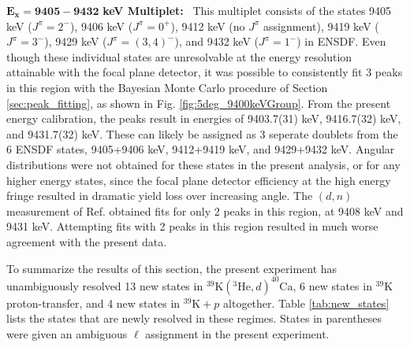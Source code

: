 \emph{$\mathbf{E_{x} = 9405-9432}$} \textbf{keV Multiplet:} \, 
This multiplet consists of the states 9405 keV ($J^{\pi} = 2^{-}$), 9406 keV ($J^{\pi} = 0^{+}$), 9412 keV (no $J^{\pi}$ assignment), 9419 keV ($J^{\pi} = 3^{-}$), 9429 keV ($J^{\pi} = (3,4)^{-}$), and 9432 keV ($J^{\pi} = 1^{-}$) in ENSDF. Even though these individual states are unresolvable at the energy resolution attainable with the focal plane detector, it was possible to consistently fit 3 peaks in this region with the Bayesian Monte Carlo procedure of Section \ref{sec:peak_fitting}, as shown in Fig. \ref{fig:5deg_9400keVGroup}. From the present energy calibration, the peaks result in energies of 9403.7(31) keV, 9416.7(32) keV, and 9431.7(32) keV. These can likely be assigned as 3 seperate doublets from the 6 ENSDF states, 9405+9406 keV, 9412+9419 keV, and 9429+9432 keV. Angular distributions were not obtained for these states in the present analysis, or for any higher energy states, since the focal plane detector efficiency at the high energy fringe resulted in dramatic yield loss over increasing angle. The $(d,n)$ measurement of Ref. \cite{Fuchs1969} obtained fits for only 2 peaks in this region, at 9408 keV and 9431 keV. Attempting fits with 2 peaks in this region resulted in much worse agreement with the present data.

To summarize the results of this section, the present experiment has unambiguously resolved 13 new states in $^{39}\mathrm{K}(^{3}\mathrm{He},d)^{40}\mathrm{Ca}$, 6 new states in $^{39}$K proton-transfer, and 4 new states in $^{39}\mathrm{K}+p$ altogether. Table \ref{tab:new_states} lists the states that are newly resolved in these regimes. States in parentheses were given an ambiguous $\ell$ assignment in the present experiment.

